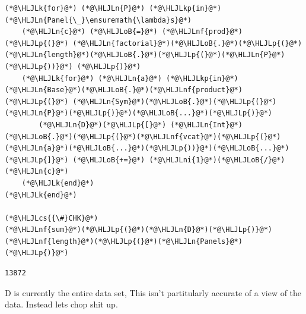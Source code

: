 \documentclass[12pt,a4paper]{article}
\newcommand{\HLJLk}[1]{\textcolor[RGB]{148,91,176}{\textbf{#1}}}
\newcommand{\HLJLkp}[1]{\textcolor[RGB]{148,91,176}{\textbf{#1}}}
\newcommand{\HLJLn}[1]{#1}
\newcommand{\HLJLnf}[1]{\textcolor[RGB]{66,102,213}{#1}}
\newcommand{\HLJLni}[1]{\textcolor[RGB]{59,151,46}{#1}}
\newcommand{\HLJLoB}[1]{\textcolor[RGB]{102,102,102}{\textbf{#1}}}
\newcommand{\HLJLp}[1]{#1}
\newcommand{\HLJLcs}[1]{\textcolor[RGB]{153,153,119}{\textit{#1}}}
\begin{document}
\begin{lstlisting}
(*@\HLJLk{for}@*) (*@\HLJLn{P}@*) (*@\HLJLkp{in}@*) (*@\HLJLn{Panel{\_}\ensuremath{\lambda}s}@*)
	(*@\HLJLn{c}@*) (*@\HLJLoB{=}@*) (*@\HLJLnf{prod}@*)(*@\HLJLp{(}@*) (*@\HLJLn{factorial}@*)(*@\HLJLoB{.}@*)(*@\HLJLp{(}@*)(*@\HLJLn{length}@*)(*@\HLJLoB{.}@*)(*@\HLJLp{(}@*)(*@\HLJLn{P}@*)(*@\HLJLp{))}@*) (*@\HLJLp{)}@*)
	(*@\HLJLk{for}@*) (*@\HLJLn{a}@*) (*@\HLJLkp{in}@*) (*@\HLJLn{Base}@*)(*@\HLJLoB{.}@*)(*@\HLJLnf{product}@*)(*@\HLJLp{(}@*) (*@\HLJLn{Sym}@*)(*@\HLJLoB{.}@*)(*@\HLJLp{(}@*)(*@\HLJLn{P}@*)(*@\HLJLp{)}@*)(*@\HLJLoB{...}@*)(*@\HLJLp{)}@*)
		(*@\HLJLn{D}@*)(*@\HLJLp{[}@*) (*@\HLJLn{Int}@*)(*@\HLJLoB{.}@*)(*@\HLJLp{(}@*)(*@\HLJLnf{vcat}@*)(*@\HLJLp{(}@*)(*@\HLJLn{a}@*)(*@\HLJLoB{...}@*)(*@\HLJLp{))}@*)(*@\HLJLoB{...}@*) (*@\HLJLp{]}@*) (*@\HLJLoB{+=}@*) (*@\HLJLni{1}@*)(*@\HLJLoB{/}@*)(*@\HLJLn{c}@*)
	(*@\HLJLk{end}@*)
(*@\HLJLk{end}@*)

(*@\HLJLcs{{\#}CHK}@*)
(*@\HLJLnf{sum}@*)(*@\HLJLp{(}@*)(*@\HLJLn{D}@*)(*@\HLJLp{)}@*)
(*@\HLJLnf{length}@*)(*@\HLJLp{(}@*)(*@\HLJLn{Panels}@*)(*@\HLJLp{)}@*)
\end{lstlisting}

\begin{lstlisting}
13872
\end{lstlisting}


D is currently the entire data set, This isn't partitularly accurate of a view of the data. Instead lets chop shit up.
\end{document}
